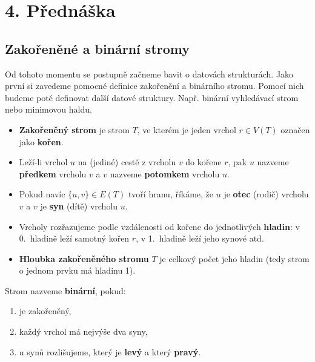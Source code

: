 \section{4. Přednáška}

\subsection{Zakořeněné a binární stromy}

Od tohoto momentu se postupně začneme bavit o datovách strukturách. Jako první si zavedeme pomocné definice zakořenění a binárního stromu. Pomocí nich budeme poté definovat další datové struktury. Např. binární vyhledávací strom nebo minimovou haldu. \bigskip

\begin{definition}
\leavevmode
\begin{itemize}
    \item \textbf{Zakořeněný strom} je strom $T$, ve kterém je jeden vrchol $r \in V(T)$ označen jako \textbf{kořen}. 
    \item Leží-li vrchol $u$ na (jediné) cestě z vrcholu $v$ do kořene $r$, pak $u$ nazveme \textbf{předkem} vrcholu $v$ a $v$ nazveme \textbf{potomkem} vrcholu $u$.
    \item Pokud navíc $\{u, v\} \in E(T)$ tvoří hranu, říkáme, že $u$ je \textbf{otec} (rodič) vrcholu $v$ a $v$ je \textbf{syn} (dítě) vrcholu $u$.
    \item Vrcholy rozřazujeme podle vzdálenosti od kořene do jednotlivých \textbf{hladin}: v 0.\ hladině leží samotný kořen $r$, v 1.\ hladině leží jeho synové atd.
    \item \textbf{Hloubka zakořeněného stromu} $T$ je celkový počet jeho hladin (tedy strom o jednom prvku má hladinu 1).
\end{itemize}
\end{definition} \bigskip

\begin{definition}
Strom nazveme \textbf{binární}, pokud:
\begin{enumerate}
    \item je zakořeněný,
    \item každý vrchol má nejvýše dva syny,
    \item u synů rozlišujeme, který je \textbf{levý} a který \textbf{pravý}.
\end{enumerate}
\end{definition} \bigskip

